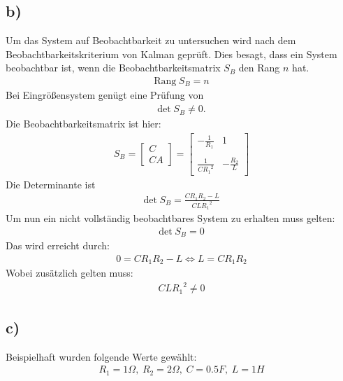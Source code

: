 \documentclass[11pt]{scrartcl} %
\begin{document}
\subsection*{b)}
Um das System auf Beobachtbarkeit zu untersuchen wird nach dem Beobachtbarkeitskriterium von Kalman geprüft. Dies besagt, dass ein System beobachtbar ist, wenn die Beobachtbarkeitsmatrix $S_B$ den Rang $n$ hat.
\begin{align*}
\text{Rang} \hspace{3pt} S_B = n
\end{align*}
Bei Eingrößensystem genügt eine Prüfung von
\begin{align*}
\text{det} \hspace{3pt} S_B \neq 0.
\end{align*}
Die Beobachtbarkeitsmatrix ist hier:
\begin{align*}
S_B=\begin{bmatrix}
C\\
CA
\end{bmatrix} =
\begin{bmatrix}
-\frac{1}{R_1} & 1 \\\\
\frac{1}{C{R_1}^2} & -\frac{R_2}{L}
\end{bmatrix}
\end{align*}
Die Determinante ist
\begin{align*}
\text{det} \hspace{3pt} S_B=\frac{CR_1R_2-L}{CL{R_1}^2}
\end{align*}
Um nun ein nicht vollständig beobachtbares System zu erhalten muss gelten:
\begin{align*}
\text{det} \hspace{3pt} S_B=0
\end{align*}
Das wird erreicht durch:
\begin{align*}
0=CR_1R_2-L\Leftrightarrow L=CR_1R_2
\end{align*}
Wobei zusätzlich gelten muss:
\begin{align*}
CL{R_1}^2 \neq 0
\end{align*}
\subsection*{c)}
Beispielhaft wurden folgende Werte gewählt:
\begin{align*}
	R_1=1\Omega,\hspace{3pt}R_2=2\Omega,\hspace{3pt}C=0.5F,\hspace{3pt}L=1H
\end{align*}
\end{document}
